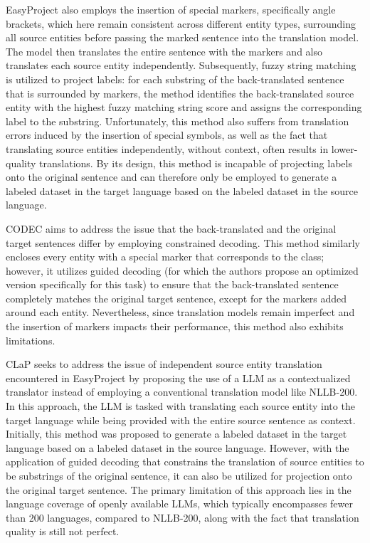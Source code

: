 EasyProject \cite{chen-etal-2023-frustratingly} also employs the insertion of special markers,
specifically angle brackets, which here remain consistent across different entity types, surrounding all
source entities before passing the marked sentence into the translation
model. The model then translates the entire sentence with the markers and also translates each source
entity independently. Subsequently, fuzzy string matching is utilized to project labels: for each substring
of the back-translated sentence that is surrounded by markers, the method identifies the back-translated
source entity with the highest fuzzy matching string score and assigns the corresponding label to the substring.
Unfortunately, this method also suffers from translation errors induced by the insertion of special
symbols, as well as the fact that translating source entities independently, without context, often
results in lower-quality translations. By its design, this method is incapable of projecting labels
onto the original sentence and can therefore only be employed to generate a labeled dataset in the target language
based on the labeled dataset in the source language.

CODEC \cite{Le2024ConstrainedDF} aims to address the issue that the back-translated and the original
target sentences differ by employing constrained decoding. This method similarly encloses every entity
with a special marker that corresponds to the class; however, it utilizes guided decoding
(for which the authors propose an optimized version specifically for this task) to ensure that
the back-translated sentence completely matches the original target sentence, except for the markers
added around each entity. Nevertheless, since translation models remain imperfect and the insertion
of markers impacts their performance, this method also exhibits limitations.

CLaP \cite{parekh-etal-2024-contextual} seeks to address the issue of independent source entity
translation encountered in EasyProject by proposing the use of a LLM as a contextualized translator
instead of employing a conventional translation model like NLLB-200. In this approach, the LLM is tasked
with translating each source entity into the target language while being provided with the entire
source sentence as context. Initially, this method was proposed to generate a labeled dataset in the
target language based on a labeled dataset in the source language. However, with the application of
guided decoding that constrains the translation of source entities to be substrings of the original
sentence, it can also be utilized for projection onto the original target sentence. The primary
limitation of this approach lies in the language coverage of openly available LLMs, which typically
encompasses fewer than 200 languages, compared to NLLB-200, along with the fact that translation
quality is still not perfect.

